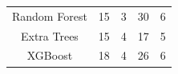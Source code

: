 \begin{table}[H]
\begin{tabular}{|c|cc|cc|}
Random Forest             & \multicolumn{1}{c|}{15}                                                           & 3                                                             & \multicolumn{1}{c|}{30}                                                           & 6                                                             \\
Extra Trees               & \multicolumn{1}{c|}{15}                                                           & 4                                                             & \multicolumn{1}{c|}{17}                                                           & 5                                                            \\
XGBoost                   & \multicolumn{1}{c|}{18}                                                           & 4                                                             & \multicolumn{1}{c|}{26}                                                           & 6                                                             \\ \hline
\end{tabular}
\label{Table 5.3}
\end{table}